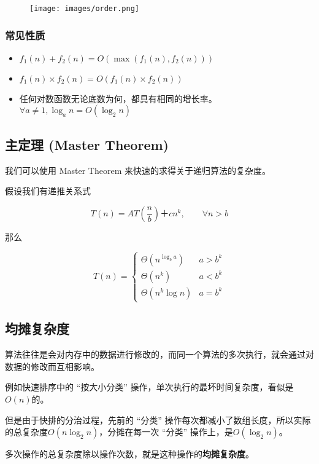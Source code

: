 \begin{figure}[h]
\centering
\texttt{[image: images/order.png]} 

\end{figure}

\subsubsection{常见性质}

\begin{itemize}
\item $f_1(n) + f_2(n) = O(\max(f_1(n), f_2(n)))$
\item $f_1(n) \times f_2(n) = O(f_1(n) \times f_2(n))$
\item 任何对数函数无论底数为何，都具有相同的增长率。$\forall a \neq 1, \log_a{n} = O(\log_2 n)$
\end{itemize}

\subsection{主定理 (Master Theorem)}

我们可以使用 Master Theorem 来快速的求得关于递归算法的复杂度。

假设我们有递推关系式

$$
T(n) = AT\left(\frac{n}{b}\right)＋cn^k, \qquad \forall n > b
$$

那么

$$
T(n) = \begin{cases}\Theta(n^{\log_b a}) & a > b^k \\ \Theta(n^k) & a< b^k \\ \Theta(n^k\log n ) & a = b^k \end{cases}
$$

\subsection{均摊复杂度}

算法往往是会对内存中的数据进行修改的，而同一个算法的多次执行，就会通过对数据的修改而互相影响。

例如快速排序中的 “按大小分类” 操作，单次执行的最坏时间复杂度，看似是$O(n)$的。

但是由于快排的分治过程，先前的 “分类” 操作每次都减小了数组长度，所以实际的总复杂度$O(n \log_2 n)$，分摊在每一次 “分类” 操作上，是$O(\log_2 n)$。

多次操作的总复杂度除以操作次数，就是这种操作的\textbf{均摊复杂度}。

